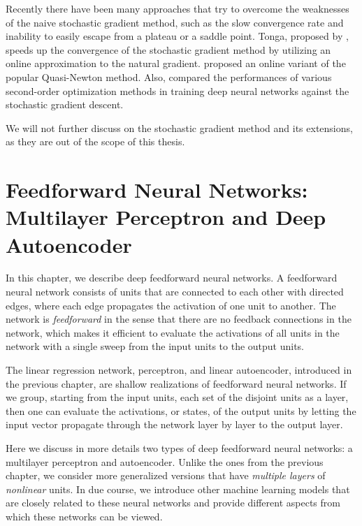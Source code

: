 \documentclass{now}
\begin{document}
Recently there have been many approaches that try to overcome the weaknesses of
the naive stochastic gradient method, such as the slow convergence rate and
inability to easily escape from a plateau or a saddle point.  Tonga, proposed by
\citet{Roux2008a}, speeds up the convergence of the stochastic gradient method
by utilizing an online approximation to the natural gradient.
\citet{Schraudolph2007} proposed an online variant of the popular Quasi-Newton
method.  Also, \citet{Le2011} compared the performances of various second-order
optimization methods in training deep neural networks against the stochastic
gradient descent.

We will not further discuss on the stochastic gradient method and its
extensions, as they are out of the scope of this thesis.




\chapter{Feedforward Neural Networks: \\{\small Multilayer
Perceptron and Deep Autoencoder}}
\label{chap:ffnn}

In this chapter, we describe deep feedforward neural networks. A feedforward
neural network consists of units that are connected to each other with directed
edges, where each edge propagates the activation of one unit to another.  The
network is \textit{feedforward} in the sense that there are no feedback
connections in the network, which makes it efficient to evaluate the activations
of all units in the network with a single sweep from the input units to the
output units.

The linear regression network, perceptron, and linear autoencoder, introduced in
the previous chapter, are shallow realizations of feedforward neural networks.
If we group, starting from the input units, each set of the disjoint units as a
layer, then one can evaluate the activations, or states, of the output units by
letting the input vector propagate through the network layer by layer to the
output layer.

Here we discuss in more details two types of deep feedforward neural networks: a
multilayer perceptron and autoencoder. Unlike the ones from the previous
chapter, we consider more generalized versions that have \textit{multiple
layers} of \textit{nonlinear} units.  In due course, we introduce other machine
learning models that are closely related to these neural networks and provide
different aspects from which these networks can be viewed.
\end{document}
